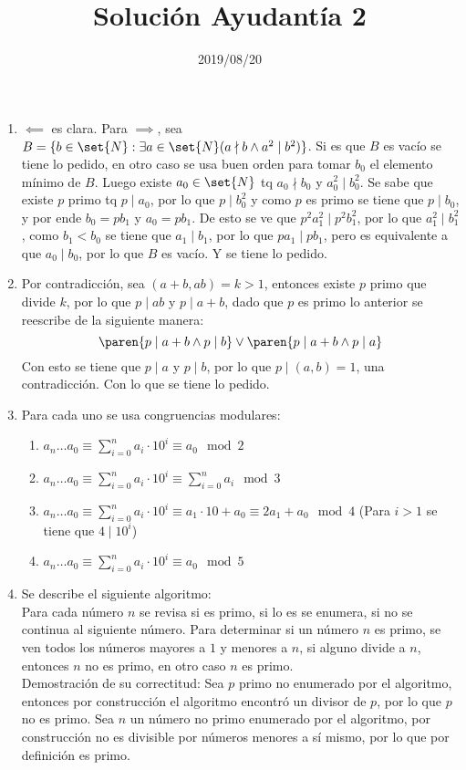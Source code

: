 \documentclass{ayudantia}
\title{Solución Ayudantía 2}
\date{2019/08/20}
\begin{document}
\maketitle
\begin{enumerate}
    \item \(\impliedby\) es clara. Para \(\implies\), sea \(B=\{b\in\set{N}:\exists a\in\set{N} (a\nmid b\wedge a^2\mid b^2)\}\). Si es que \(B\) es vacío se tiene lo pedido, en otro caso se usa buen orden para tomar \(b_0\) el elemento mínimo de \(B\). Luego existe \(a_0\in\set{N}\) tq \(a_0\nmid b_0\) y \(a_0^2\mid b_0^2\). Se sabe que existe \(p\) primo tq \(p\mid a_0\), por lo que \(p\mid b_0^2\) y como \(p\) es primo se tiene que \(p\mid b_0\), y por ende \(b_0=pb_1\) y \(a_0=pb_1\). De esto se ve que \(p^2a_1^2\mid p^2b_1^2\), por lo que \(a_1^2\mid b_1^2\), como \(b_1<b_0\) se tiene que \(a_1\mid b_1\), por lo que \(pa_1\mid pb_1\), pero es equivalente a que \(a_0\mid b_0\), por lo que \(B\) es vacío. Y se tiene lo pedido.
    \item Por contradicción, sea \((a+b,ab)=k>1\), entonces existe \(p\) primo que divide \(k\), por lo que \(p\mid ab\) y \(p\mid a+b\), dado que \(p\) es primo lo anterior se reescribe de la siguiente manera:
    \[\paren{p\mid a+b\wedge p\mid b}\vee\paren{p\mid a+b\wedge p\mid a}\]
    Con esto se tiene que \(p\mid a\) y \(p\mid b\), por lo que \(p\mid (a,b)=1\), una contradicción. Con lo que se tiene lo pedido.
    \item Para cada uno se usa congruencias modulares:
    \begin{enumerate}
        \item \(a_n\dots a_0\equiv\sum_{i=0}^na_i\cdot 10^i\equiv a_0\mod 2\)
        \item \(a_n\dots a_0\equiv\sum_{i=0}^na_i\cdot 10^i\equiv\sum_{i=0}^na_i\mod 3\)
        \item \(a_n\dots a_0\equiv\sum_{i=0}^na_i\cdot 10^i\equiv a_1\cdot 10+a_0\equiv 2a_1+a_0\mod 4\) (Para \(i>1\) se tiene que \(4\mid 10^i\))
        \item \(a_n\dots a_0\equiv\sum_{i=0}^na_i\cdot 10^i\equiv a_0\mod 5\)
    \end{enumerate}
    \item Se describe el siguiente algoritmo:\\
    Para cada número \(n\) se revisa si es primo, si lo es se enumera, si no se continua al siguiente número. Para determinar si un número \(n\) es primo, se ven todos los números mayores a \(1\) y menores a \(n\), si alguno divide a \(n\), entonces \(n\) no es primo, en otro caso \(n\) es primo.\\
    Demostración de su correctitud: Sea \(p\) primo no enumerado por el algoritmo, entonces por construcción el algoritmo encontró un divisor de \(p\), por lo que \(p\) no es primo. Sea \(n\) un número no primo enumerado por el algoritmo, por construcción no es divisible por números menores a sí mismo, por lo que por definición es primo.
\end{enumerate}
\end{document}
